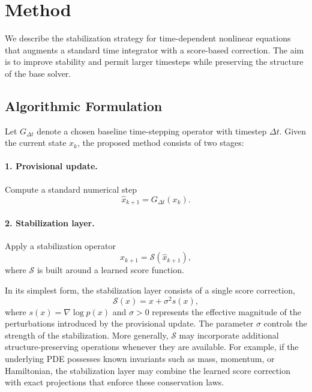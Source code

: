 \documentclass[letterpaper]{article} %
\begin{document}
\section{Method}
\label{sec:score_method}

We describe the stabilization strategy for time-dependent nonlinear equations that augments a standard time integrator with a score-based correction. The aim is to improve stability and permit larger timesteps while preserving the structure of the base solver.



\subsection{Algorithmic Formulation}

Let $G_{\Delta t}$ denote a chosen baseline time-stepping operator
with timestep $\Delta t$. Given the current state $x_k$, the proposed
method consists of two stages:

\paragraph{1. Provisional update.}
Compute a standard numerical step
\begin{equation}
\hat{x}_{k+1}=G_{\Delta t}(x_k).
\label{eq:predictor}
\end{equation}

\paragraph{2. Stabilization layer.}
Apply a stabilization operator
\begin{equation}
x_{k+1}=\mathcal{S}(\hat{x}_{k+1}),
\label{eq:stabilization}
\end{equation}
where $\mathcal{S}$ is built around a learned score function.

In its simplest form, the stabilization layer consists of a single
score correction,
\begin{equation}
\mathcal{S}(x)=x+\sigma^2 s(x),
\label{eq:score_update}
\end{equation}
where
$s(x)=\nabla\log p(x)$
and $\sigma>0$ represents the effective magnitude of the perturbations
introduced by the provisional update. The parameter $\sigma$
controls the strength of the stabilization.
More generally, $\mathcal{S}$ may incorporate additional
structure-preserving operations whenever they are available.
For example, if the underlying PDE possesses known invariants such as
mass, momentum, or Hamiltonian, the stabilization layer may combine
the learned score correction with exact projections that enforce these
conservation laws.
\end{document}
